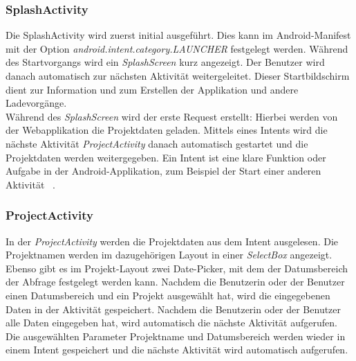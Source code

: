 \subsubsection{SplashActivity}
Die SplashActivity wird zuerst initial ausgeführt. Dies kann im Android-Manifest mit der Option \textit{android.intent.category.LAUNCHER} festgelegt werden. Während des Startvorgangs wird ein \textit{SplashScreen} kurz angezeigt. Der Benutzer wird danach automatisch zur nächsten Aktivität weitergeleitet. Dieser Startbildschirm dient zur Information und zum Erstellen der Applikation und andere Ladevorgänge. \\ Während des \textit{SplashScreen} wird der erste Request erstellt: Hierbei werden von der Webapplikation die Projektdaten geladen. Mittels eines Intents wird die nächste Aktivität \textit{ProjectActivity} danach automatisch gestartet und die Projektdaten werden weitergegeben. Ein Intent ist eine klare Funktion oder Aufgabe in der Android-Applikation, zum Beispiel der Start einer anderen Aktivität ~\parencite{vogelIntent}.
\subsubsection{ProjectActivity}
In der \textit{ProjectActivity} werden die Projektdaten aus dem Intent ausgelesen. Die Projektnamen werden im dazugehörigen Layout in einer \textit{SelectBox} angezeigt. Ebenso gibt es im Projekt-Layout zwei Date-Picker, mit dem der Datumsbereich der Abfrage festgelegt werden kann. Nachdem die Benutzerin oder der Benutzer einen Datumsbereich und ein Projekt ausgewählt hat, wird die eingegebenen Daten in der Aktivität gespeichert. Nachdem die Benutzerin oder der Benutzer alle Daten eingegeben hat, wird automatisch die nächste Aktivität aufgerufen. Die ausgewählten Parameter Projektname und Datumsbereich werden wieder in einem Intent gespeichert und die nächste Aktivität wird automatisch aufgerufen.
